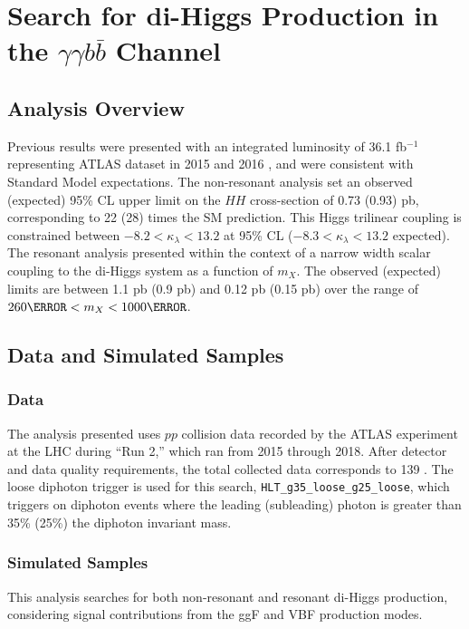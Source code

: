\chapter{Search for di-Higgs Production in the \texorpdfstring{$\gamma\gamma b\bar{b}$}{yybb} Channel}
\section{Analysis Overview}

Previous results were presented with an integrated luminosity of 36.1 fb$^{-1}$ representing ATLAS dataset in 2015 and 2016 \cite{HIGG-2016-15}, and were consistent with Standard Model expectations. The non-resonant analysis set an observed (expected) 95\% CL upper limit on the $HH$ cross-section of 0.73 (0.93) pb, corresponding to 22 (28) times the SM prediction. This Higgs trilinear coupling is constrained between $-8.2 < \kappa_\lambda < 13.2$ at 95\% CL ($-8.3 < \kappa_\lambda < 13.2$ expected). The resonant analysis presented within the context of a narrow width scalar coupling to the di-Higgs system as a function of $m_X$. The observed (expected) limits are between 1.1 pb (0.9 pb) and 0.12 pb (0.15 pb) over the range of $\unit{260}{\GeV} < m_X < \unit{1000}{\GeV}$.

\section{Data and Simulated Samples}


\subsection{Data}

The analysis presented uses $pp$ collision data recorded by the ATLAS experiment at the LHC during ``Run 2,'' which ran from 2015 through 2018. After detector and data quality requirements, the total collected data corresponds to 139 \ifb. The loose diphoton trigger is used for this search, \texttt{HLT\_g35\_loose\_g25\_loose}, which triggers on diphoton events where the leading (subleading) photon \pt is greater than 35\% (25\%) the diphoton invariant mass.

\subsection{Simulated Samples}

This analysis searches for both non-resonant and resonant di-Higgs production, considering signal contributions from the ggF and VBF production modes.


